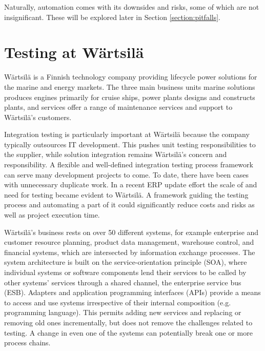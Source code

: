 \documentclass[12pt,a4paper,oneside,pdftex]{report}
\begin{document}
Naturally, automation comes with its downsides and risks, some of which are not insignificant. These will be explored later in Section \ref{section:pitfalls}.

\section{Testing at Wärtsilä}

Wärtsilä is a Finnish technology company providing lifecycle power solutions for the marine and energy markets. The three main business units marine solutions produces engines primarily for cruise ships, power plants designs and constructs plants, and services offer a range of maintenance services and support to Wärtsilä's customers. \citep{wartsila2013web}


Integration testing is particularly important at Wärtsilä because the company typically outsources IT development. This pushes unit testing responsibilities to the supplier, while solution integration remains Wärtsilä's concern and responsibility. A flexible and well-defined integration testing process framework can serve many development projects to come. To date, there have been cases with unnecessary duplicate work. In a recent ERP update effort the scale of and need for testing became evident to Wärtsilä. A framework guiding the testing process and automating a part of it could significantly reduce costs and risks as well as project execution time.

Wärtsilä's business rests on over 50 different systems, for example enterprise and customer resource planning, product data management, warehouse control, and financial systems, which are intersected by information exchange processes. The system architecture is built on the service-orientation principle (SOA), where individual systems or software components lend their services to be called by other systems' services through a shared channel, the enterprise service bus (ESB). Adapters and application programming interfaces (APIs) provide a means to access and use systems irrespective of their internal composition (e.g. programming language). This permits adding new services and replacing or removing old ones incrementally, but does not remove the challenges related to testing. A change in even one of the systems can potentially break one or more process chains. 
\end{document}
